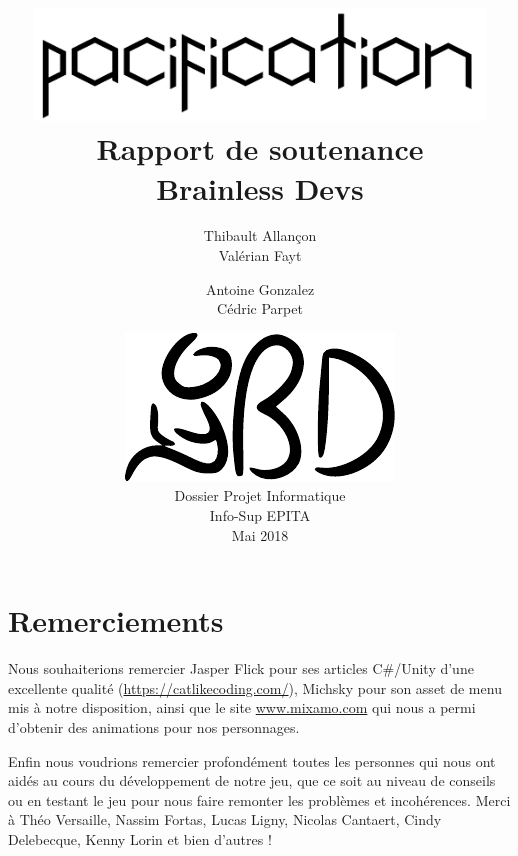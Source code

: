 \documentclass[12pt]{report}
\begin{document}
\title{
	{\vspace{3em}\protect\centering\protect\includegraphics[width=0.9\textwidth]{Pacification_logo}}\\
	{\vspace{4em}\Huge Rapport de soutenance}\\
	{\large Brainless Devs}
}
\author{
	Thibault Allançon\\
	Valérian Fayt
	\and
	Antoine Gonzalez\\
	Cédric Parpet}
\date{
	{\vfill\protect\centering\protect\includegraphics{brainless_devs.pdf}}\\
	Dossier Projet Informatique\\
	Info-Sup EPITA\\
	Mai 2018
}

\maketitle
\tableofcontents

\chapter{Remerciements}

Nous souhaiterions remercier Jasper Flick pour ses articles C\#/Unity d'une
excellente qualité (\url{https://catlikecoding.com/}), Michsky pour son asset de
menu mis à notre disposition, ainsi que le site \url{www.mixamo.com} qui nous a
permi d’obtenir des animations pour nos personnages.

Enfin nous voudrions remercier profondément toutes les personnes qui nous ont
aidés au cours du développement de notre jeu, que ce soit au niveau de conseils
ou en testant le jeu pour nous faire remonter les problèmes et incohérences.
Merci à Théo Versaille, Nassim Fortas, Lucas Ligny, Nicolas Cantaert, Cindy
Delebecque, Kenny Lorin et bien d'autres !
\end{document}
